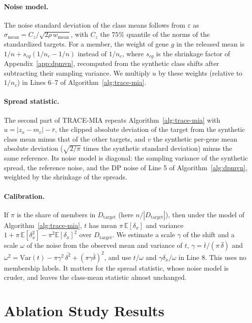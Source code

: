 \documentclass{article}
\newcommand{\ours}{TRACE-MIA}
\begin{document}
\paragraph{Noise model.}
The noise standard deviation of the class means follows from $\varepsilon$ as $\sigma_\mathrm{mean} = C_z/\sqrt{2\rho\,w_\mathrm{mean}}$, with $C_z$ the $75\%$ quantile of the norms of the standardized targets. For a member, the weight of gene $g$ in the released mean is $1/n + s_{cg}(1/n_c - 1/n)$ instead of $1/n_c$, where $s_{cg}$ is the shrinkage factor of Appendix~\ref{app:dpmvn}, recomputed from the synthetic class shifts after subtracting their sampling variance. We multiply $u$ by these weights (relative to $1/n_c$) in Lines 6--7 of Algorithm~\ref{alg:trace-mia}.

\paragraph{Spread statistic.}
The second part of \ours{} repeats Algorithm~\ref{alg:trace-mia} with $u=|z_x-m_c|-\bar r$, the clipped absolute deviation of the target from the synthetic class mean minus that of the other targets, and $v$ the synthetic per-gene mean absolute deviation ($\sqrt{2/\pi}$ times the synthetic standard deviation) minus the same reference. Its noise model is diagonal: the sampling variance of the synthetic spread, the reference noise, and the DP noise of Line 5 of Algorithm~\ref{alg:dpmvn}, weighted by the shrinkage of the spreads.

\paragraph{Calibration.}
If $\pi$ is the share of members in $D_\mathrm{target}$ (here $n/|D_\mathrm{target}|$), then under the model of Algorithm~\ref{alg:trace-mia}, $t$ has mean $\pi\,\mathbb E[\delta_x]$ and variance $1+\pi\,\mathbb E[\delta_x^2]-\pi^2\mathbb E[\delta_x]^2$ over $D_\mathrm{target}$. We estimate a scale $\gamma$ of the shift and a scale $\omega$ of the noise from the observed mean and variance of $t$, $\gamma=\bar t/(\pi\,\bar\delta)$ and $\omega^2=\mathrm{Var}(t)-\pi\gamma^2\,\overline{\delta^2}+(\pi\gamma\bar\delta)^2$, and use $t/\omega$ and $\gamma\delta_x/\omega$ in Line 8. This uses no membership labels. It matters for the spread statistic, whose noise model is cruder, and leaves the class-mean statistic almost unchanged.

\section{Ablation Study Results}
\label{app:ablation}
\end{document}

